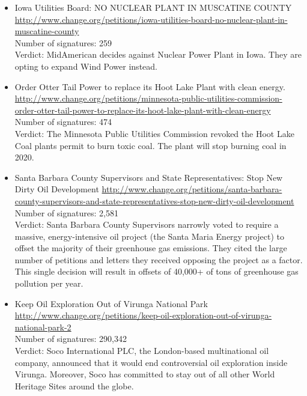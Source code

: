 \begin{itemize}
\item Iowa Utilities Board: NO NUCLEAR PLANT IN MUSCATINE COUNTY
\url{http://www.change.org/petitions/iowa-utilities-board-no-nuclear-plant-in-muscatine-county}
\\Number of signatures: 259
\\Verdict: MidAmerican decides against Nuclear Power Plant in Iowa. They are opting to expand Wind Power instead.

\item Order Otter Tail Power to replace its Hoot Lake Plant with clean energy.
\url{http://www.change.org/petitions/minnesota-public-utilities-commission-order-otter-tail-power-to-replace-its-hoot-lake-plant-with-clean-energy}
\\Number of signatures: 474
\\Verdict: The Minnesota Public Utilities Commission revoked the Hoot Lake Coal plants permit to burn toxic coal. The plant will stop burning coal in 2020.

\item Santa Barbara County Supervisors and State Representatives: Stop New Dirty Oil Development
\url{http://www.change.org/petitions/santa-barbara-county-supervisors-and-state-representatives-stop-new-dirty-oil-development}
\\Number of signatures: 2,581
\\Verdict: Santa Barbara County Supervisors narrowly voted to require a massive, energy-intensive oil project (the Santa Maria Energy project) to offset the majority of their greenhouse gas emissions. They cited the large number of petitions and letters they received opposing the project as a factor. This single decision will result in offsets of 40,000+ of tons of greenhouse gas pollution per year.

\item Keep Oil Exploration Out of Virunga National Park
\url{http://www.change.org/petitions/keep-oil-exploration-out-of-virunga-national-park-2}
\\Number of signatures: 290,342 
\\Verdict: Soco International PLC, the London-based multinational oil company, announced that it would end controversial oil exploration inside Virunga. Moreover, Soco has committed to stay out of all other World Heritage Sites around the globe. 

\end{itemize}

